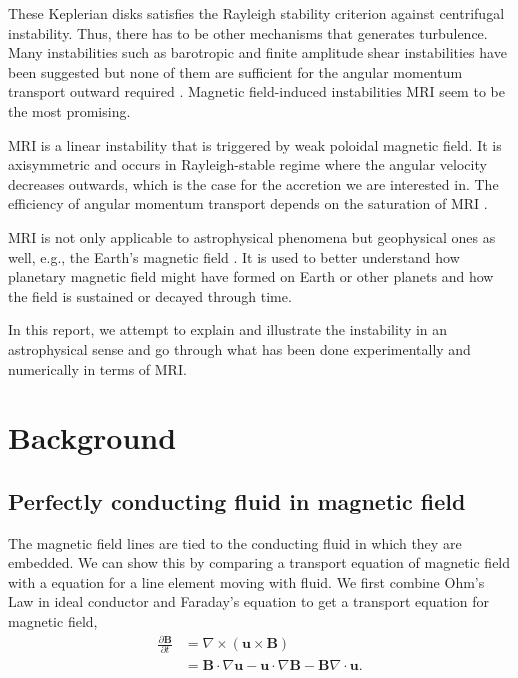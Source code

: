 \documentclass{jfm}
\newcommand{\del}{\nabla}
\begin{document}
These Keplerian disks satisfies the Rayleigh stability criterion
\citep[see][]{Rayleigh1916} against centrifugal instability.  Thus, there has
to be other mechanisms that generates turbulence. Many instabilities such as
barotropic \citep{Dubrulle2005b} and finite amplitude shear instabilities
\citep{Dubrulle2005a, Lesur2005} have been suggested but none of them are
sufficient for the angular momentum transport outward required \citep{Ji2006}.
Magnetic field-induced instabilities MRI seem to be the most promising. 

MRI is a linear instability that is triggered by weak poloidal magnetic field.
It is axisymmetric and occurs in Rayleigh-stable regime where the angular
velocity decreases outwards, which is the case for the accretion we are
interested in. The efficiency of angular momentum transport depends on the
saturation of MRI \citep{Balbus1991, Balbus1998}.

MRI is not only applicable to astrophysical phenomena but geophysical ones as
well, e.g., the Earth's magnetic field \citep{Petitdemange2008}. It is used to
better understand how planetary magnetic field might  have formed on Earth or
other planets and how the field is sustained or decayed through time.

In this report, we attempt to explain and illustrate the instability in an
astrophysical sense and go through what has been done experimentally and
numerically in terms of MRI.



\section{Background}

%
%
\subsection{Perfectly conducting fluid in magnetic field}

The magnetic field lines are tied to the conducting fluid in which they are 
embedded. We can show this by comparing a transport equation of magnetic field
with a equation for a line element moving with fluid. We first combine Ohm's 
Law in ideal conductor and Faraday's equation to get a transport equation for 
magnetic field,
\begin{align}
    \frac{\partial \mathbf{B}}{\partial t} &= \del \times (\mathbf{u}\times \mathbf{B}) \nonumber \\
    &=\mathbf{B}\cdot\del \mathbf{u} - {\mathbf{u}\cdot\del}\mathbf{B} -\mathbf{B}\del\cdot\mathbf{u}.
\end{align}
\end{document}
